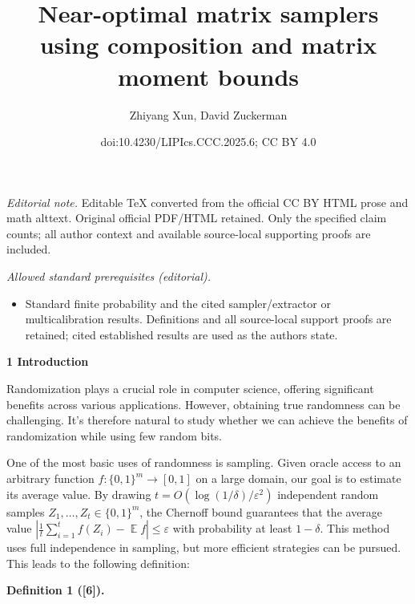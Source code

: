 \documentclass[10pt,a4paper]{article}
\title{Near-optimal matrix samplers using composition and matrix moment bounds}
\author{Zhiyang Xun, David Zuckerman}
\date{doi:10.4230/LIPIcs.CCC.2025.6; CC BY 4.0}
\begin{document}
\maketitle
\noindent\textit{Editorial note.} Editable TeX converted from the official CC BY HTML prose and math alttext. Original official PDF/HTML retained. Only the specified claim counts; all author context and available source-local supporting proofs are included.\par\medskip
\noindent\textit{Allowed standard prerequisites (editorial).}\begin{itemize}
\item Standard finite probability and the cited sampler/extractor or multicalibration results. Definitions and all source-local support proofs are retained; cited established results are used as the authors state.
\end{itemize}\medskip


\par\medskip\noindent\textbf{
1 Introduction}\par




Randomization plays a crucial role in computer science, offering significant benefits across various applications. However, obtaining true randomness can be challenging.
It’s therefore natural to study whether we can achieve the benefits of randomization while using few random bits.\par




One of the most basic uses of randomness is sampling.
Given oracle access to an arbitrary function $f:\{0,1\}^{m}\to[0,1]$ on a large domain, our goal is to estimate its average value.
By drawing $t=O(\log(1/\delta)/\varepsilon^{2})$ independent random samples $Z_{1},\dots,Z_{t}\in\{0,1\}^{m}$,
the Chernoff bound guarantees that the average value $\left|\frac{1}{t}\sum_{i=1}^{t}f(Z_{i})-\operatorname*{\mathbb{E}}f\right|\leq\varepsilon$ with probability at least $1-\delta$. This method uses full independence in sampling, but more efficient strategies can be pursued. This leads to the following definition:\par





\par\medskip\noindent\textbf{
\textbf{Definition 1}\textbf{ }([6])\textbf{.}
}\par
\end{document}
